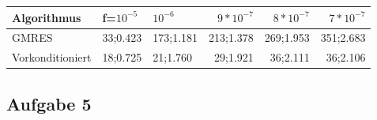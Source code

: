 \documentclass{article}
\begin{document}
\begin{tabular}{|l|l|l|r|r|r|}
	\hline
	Algorithmus&f=$10^{-5}$ &$10^{-6}$&$9*10^{-7}$& $8*10^{-7}$& $7*10^{-7}$\\
	\hline
	GMRES & 33;0.423 & 173;1.181 & 213;1.378 & 269;1.953 & 351;2.683 \\
	Vorkonditioniert & 18;0.725 & 21;1.760 & 29;1.921 & 36;2.111 & 36;2.106 \\
	\hline
	
\end{tabular}

\subsection{Aufgabe 5}
\end{document}
